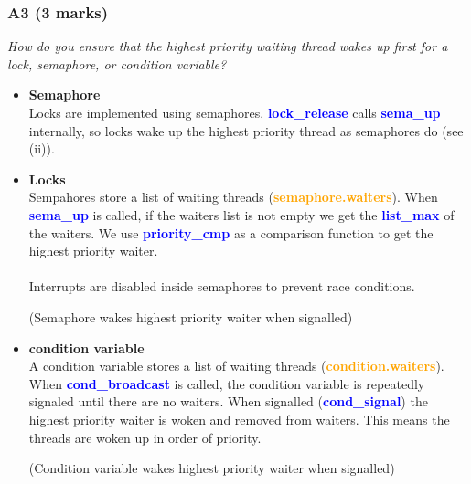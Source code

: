 \documentclass{report}
\newcommand{\question}[1]{\textit{#1} \\ }
\newcommand{\bullpara}[2]{\item \textbf{#1} \ #2}
\newcommand{\fun}[1]{\textcolor{blue}{\textbf{#1}}}
\newcommand{\file}[1]{\textcolor{green}{\textbf{#1}}}
\newcommand{\struct}[1]{\textcolor{orange}{\textbf{#1}}}
\newcommand{\pintoscode}[4]{}
\begin{document}
                \subsubsection*{A3  (3 marks) }
                    \question{How do you ensure that the highest priority waiting thread wakes up first for a lock, semaphore, or condition variable?}
                        \begin{itemize}
                            \bullpara{Semaphore}{
                                \\ Locks are implemented using semaphores. \fun{lock\_release} calls \fun{sema\_up} internally, so locks wake up the highest priority thread as semaphores do (see (ii)).
                            }
                            \bullpara{Locks}{
                                \\ Sempahores store a list of waiting threads (\struct{semaphore.waiters}). When \fun{sema\_up} is called, if the waiters list is not empty we get the \fun{list\_max} of the waiters. We use \fun{priority\_cmp} as a comparison function to get the highest priority waiter.
                                \\
                                \\ Interrupts are disabled inside semaphores to prevent race conditions.
                                \pintoscode{118}{124}{synch.c}{synch.c}
                                (Semaphore wakes highest priority waiter when signalled)
                            }
                            \bullpara{condition variable}{
                               \\A condition variable stores a list of waiting threads (\struct{condition.waiters}). When \fun{cond\_broadcast} is called, the condition variable is repeatedly signaled until there are no waiters. When signalled (\fun{cond\_signal}) the highest priority waiter is woken and removed from waiters. This means the threads are woken up in order of priority.
                                \pintoscode{334}{339}{synch.c}{synch.c}
                                (Condition variable wakes highest priority waiter when signalled)
                            }
                        \end{itemize}
\end{document}
